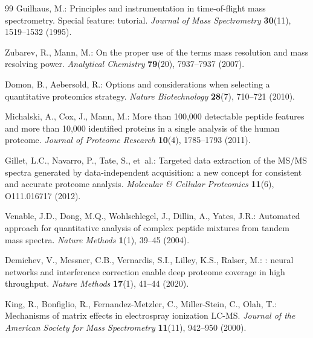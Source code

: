 \documentclass[11pt,twoside,openright]{book}
\begin{document}
\begin{thebibliography}{99}
Guilhaus, M.:
\newblock Principles and instrumentation in time-of-flight mass spectrometry. Special feature: tutorial.
\newblock \emph{Journal of Mass Spectrometry} \textbf{30}(11), 1519--1532 (1995).
\newblock {}

Zubarev, R., Mann, M.:
\newblock On the proper use of the terms mass resolution and mass resolving power.
\newblock \emph{Analytical Chemistry} \textbf{79}(20), 7937--7937 (2007).
\newblock {}

Domon, B., Aebersold, R.:
\newblock Options and considerations when selecting a quantitative proteomics strategy.
\newblock \emph{Nature Biotechnology} \textbf{28}(7), 710--721 (2010).
\newblock {}

Michalski, A., Cox, J., Mann, M.:
\newblock More than 100,000 detectable peptide features and more than 10,000 identified proteins in a single analysis of the human proteome.
\newblock \emph{Journal of Proteome Research} \textbf{10}(4), 1785--1793 (2011).
\newblock {}

Gillet, L.C., Navarro, P., Tate, S., et~al.:
\newblock Targeted data extraction of the {MS/MS} spectra generated by data-independent acquisition: a new concept for consistent and accurate proteome analysis.
\newblock \emph{Molecular \& Cellular Proteomics} \textbf{11}(6), O111.016717 (2012).
\newblock {}

Venable, J.D., Dong, M.Q., Wohlschlegel, J., Dillin, A., Yates, J.R.:
\newblock Automated approach for quantitative analysis of complex peptide mixtures from tandem mass spectra.
\newblock \emph{Nature Methods} \textbf{1}(1), 39--45 (2004).
\newblock {}

Demichev, V., Messner, C.B., Vernardis, S.I., Lilley, K.S., Ralser, M.:
: neural networks and interference correction enable deep proteome coverage in high throughput.
\newblock \emph{Nature Methods} \textbf{17}(1), 41--44 (2020).
\newblock {}

King, R., Bonfiglio, R., Fernandez-Metzler, C., Miller-Stein, C., Olah, T.:
\newblock Mechanisms of matrix effects in electrospray ionization {LC-MS}.
\newblock \emph{Journal of the American Society for Mass Spectrometry} \textbf{11}(11), 942--950 (2000).
\newblock {}


\end{thebibliography}
\end{document}
